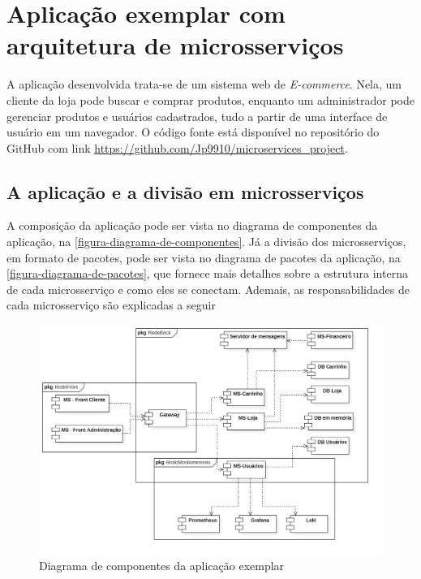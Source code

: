 \chapter{Aplicação exemplar com arquitetura de microsserviços}\label{chapter-aplicacao}



A aplicação desenvolvida trata-se de um sistema web de \emph{E-commerce}. Nela, um cliente da loja pode buscar e comprar produtos, enquanto um administrador pode gerenciar produtos e usuários cadastrados, tudo a partir de uma interface de usuário em um navegador.
O código fonte está disponível no repositório do GitHub com link \url{https://github.com/Jp9910/microservices_project}.

\section{A aplicação e a divisão em microsserviços}

A composição da aplicação pode ser vista no diagrama de componentes da aplicação, na \autoref{figura-diagrama-de-componentes}. Já a divisão dos microsserviços, em formato de pacotes, pode ser vista no diagrama de pacotes da aplicação, na \autoref{figura-diagrama-de-pacotes}, que fornece mais detalhes sobre a estrutura interna de cada microsserviço e como eles se conectam. Ademais, as responsabilidades de cada microsserviço são explicadas a seguir

\begin{figure}[htb]
	\caption{\label{figura-diagrama-de-componentes}Diagrama de componentes da aplicação exemplar}
	\begin{center}
	    \includegraphics[scale=0.27]{Diagramas/imagens/Componentes-Redes.jpg}
	\end{center}
\end{figure}

